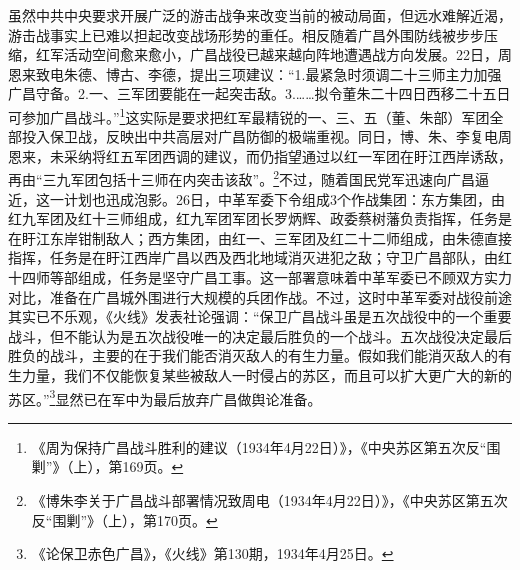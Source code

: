 虽然中共中央要求开展广泛的游击战争来改变当前的被动局面，但远水难解近渴，游击战事实上已难以担起改变战场形势的重任。相反随着广昌外围防线被步步压缩，红军活动空间愈来愈小，广昌战役已越来越向阵地遭遇战方向发展。22日，周恩来致电朱德、博古、李德，提出三项建议：“1.最紧急时须调二十三师主力加强广昌守备。2.一、三军团要能在一起突击敌。3.……拟令董朱二十四日西移二十五日可参加广昌战斗。”\footnote{《周为保持广昌战斗胜利的建议（1934年4月22日）》，《中央苏区第五次反“围剿”》（上），第169页。}这实际是要求把红军最精锐的一、三、五（董、朱部）军团全部投入保卫战，反映出中共高层对广昌防御的极端重视。同日，博、朱、李复电周恩来，未采纳将红五军团西调的建议，而仍指望通过以红一军团在盱江西岸诱敌，再由“三九军团包括十三师在内突击该敌”。\footnote{《博朱李关于广昌战斗部署情况致周电（1934年4月22日）》，《中央苏区第五次反“围剿”》（上），第170页。}不过，随着国民党军迅速向广昌逼近，这一计划也迅成泡影。26日，中革军委下令组成3个作战集团：东方集团，由红九军团及红十三师组成，红九军团军团长罗炳辉、政委蔡树藩负责指挥，任务是在盱江东岸钳制敌人；西方集团，由红一、三军团及红二十二师组成，由朱德直接指挥，任务是在盱江西岸广昌以西及西北地域消灭进犯之敌；守卫广昌部队，由红十四师等部组成，任务是坚守广昌工事。这一部署意味着中革军委已不顾双方实力对比，准备在广昌城外围进行大规模的兵团作战。不过，这时中革军委对战役前途其实已不乐观，《火线》发表社论强调：“保卫广昌战斗虽是五次战役中的一个重要战斗，但不能认为是五次战役唯一的决定最后胜负的一个战斗。五次战役决定最后胜负的战斗，主要的在于我们能否消灭敌人的有生力量。假如我们能消灭敌人的有生力量，我们不仅能恢复某些被敌人一时侵占的苏区，而且可以扩大更广大的新的苏区。”\footnote{《论保卫赤色广昌》，《火线》第130期，1934年4月25日。}显然已在军中为最后放弃广昌做舆论准备。


